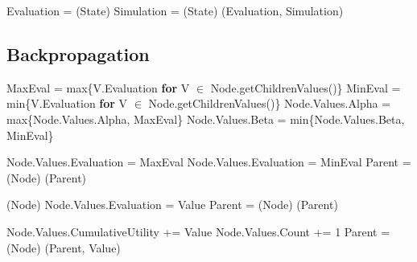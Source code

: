 \begin{algorithm}[H]
    \begin{algorithmic}[1]
            \State Evaluation = (State)
            \State Simulation = (State)
            \State \Return (Evaluation, Simulation)
        \EndProcedure
    \end{algorithmic}    
\end{algorithm}

\newpage
\subsection*{Backpropagation}
\begin{algorithm}[H]
    \begin{algorithmic}[1]
                \State MaxEval = max\{V.Evaluation \textbf{for} V $\in$ Node.getChildrenValues()\}
                \State MinEval = min\{V.Evaluation \textbf{for} V $\in$ Node.getChildrenValues()\}
                    \State Node.Values.Alpha = max\{Node.Values.Alpha, MaxEval\}
                \Else
                    \State Node.Values.Beta = min\{Node.Values.Beta, MinEval\}
                \EndIf
                
                        \State Node.Values.Evaluation = MaxEval
                    \Else
                        \State Node.Values.Evaluation = MinEval
                    \EndIf
                    \State Parent = (Node)
                        (Parent)
                    \EndIf                    
                \EndIf

            \EndProcedure
                \State {}(Node)
            \Else
                \State Node.Values.Evaluation = Value
                \State Parent = (Node)
                    (Parent)
                \EndIf
            \EndIf
        \EndProcedure
    \end{algorithmic}    
\end{algorithm}

\begin{algorithm}[H]
    \begin{algorithmic}[1]
            \State Node.Values.CumulativeUtility += Value
            \State Node.Values.Count += 1
            \State Parent = (Node)
                \State {}(Parent, Value)
            \EndIf
        \EndProcedure
    \end{algorithmic}    
\end{algorithm}

